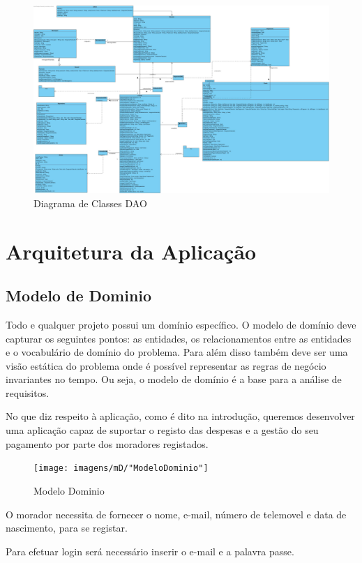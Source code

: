 \begin{figure}[htb!]
	\centering
	\includegraphics[scale=0.2]{imagens/diagramaClasses/DiagramaClasseDAO}  
	\caption{Diagrama de Classes DAO  }  
\end{figure}


\chapter{Arquitetura da Aplicação}

\section{Modelo de Dominio }
Todo e qualquer projeto possui um domínio específico. O modelo de domínio deve capturar os seguintes pontos: as entidades, os relacionamentos entre as entidades e o vocabulário de domínio do problema. Para além disso também deve ser uma visão estática do problema onde é possível representar as regras de negócio invariantes no tempo. Ou seja, o modelo de domínio é a base para a análise de requisitos.

No que diz respeito à aplicação, como é dito na introdução, queremos desenvolver uma aplicação capaz de suportar o registo das despesas e a gestão do seu pagamento por parte dos moradores registados.


\begin{figure}[htb!]
	\texttt{[image: imagens/mD/"ModeloDominio"]}  
	\caption{Modelo Dominio}  
\end{figure}

O morador necessita de fornecer o nome, e-mail, número de telemovel e data de nascimento, para se registar. 

Para efetuar login será necessário inserir o e-mail e a palavra passe. 

